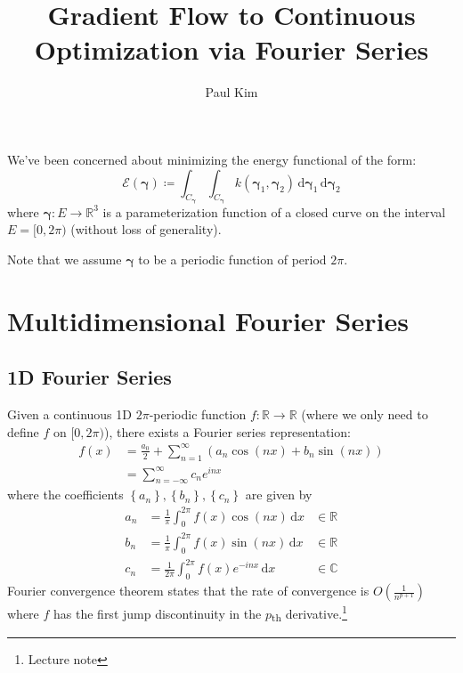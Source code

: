 \documentclass[a4paper]{article}
\title{Gradient Flow to Continuous Optimization via Fourier Series}
\author{Paul Kim}
\newcommand{\dx}{\, \text{d} x}
\newcommand{\dgammabf}{\, \text{d} \boldsymbol{\gamma}}
\begin{document}
\maketitle

We've been concerned about minimizing the energy functional of the form:
\begin{equation}
    \mathcal{E} (\boldsymbol{\gamma}) \coloneqq \int_{C_{\boldsymbol{\gamma}}} \int_{C_{\boldsymbol{\gamma}}} k\left( \boldsymbol{\gamma}_1, \boldsymbol{\gamma}_2 \right) \dgammabf_1 \dgammabf_2
\end{equation}
where $\boldsymbol{\gamma}: E \rightarrow \mathbb{R}^{3}$ is a parameterization function of a closed curve on the interval $E = [ 0, 2\pi )$ (without loss of generality).

Note that we assume $\boldsymbol{\gamma}$ to be a periodic function of period $2 \pi$.

\section{Multidimensional Fourier Series}
\subsection{1D Fourier Series}
Given a continuous 1D $2\pi$-periodic function $f: \mathbb{R} \rightarrow \mathbb{R}$ (where we only need to define $f$ on $[0, 2\pi)$), there exists a Fourier series representation:
\begin{align}
    f (x) &= \frac{a_0}{2} + \sum_{n = 1}^{\infty} \left( a_n \cos {\left( nx \right)} + b_n \sin {\left( nx \right)} \right) \\
    &= \sum_{n=-\infty}^{\infty} c_n e^{i n x}
\end{align}
where the coefficients $\left\{ a_n \right\}, \left\{ b_n \right\}, \left\{ c_n \right\}$ are given by
\begin{align}
    a_n &= \frac{1}{\pi} \int_{0}^{2\pi} f(x) \cos {\left( nx \right)} \dx &\in \mathbb{R}\\
    b_n &= \frac{1}{\pi} \int_{0}^{2\pi} f(x) \sin {\left( nx \right)} \dx &\in \mathbb{R} \\
    c_n &= \frac{1}{2 \pi} \int_{0}^{2\pi} f(x) e^{-inx} \dx &\in \mathbb{C}
\end{align}
Fourier convergence theorem states that the rate of convergence is $O\left( \frac{1}{n^{p+1}} \right)$ where $f$ has the first jump discontinuity in the $p$\textsubscript{th} derivative.\footnote{Lecture note}
\end{document}

